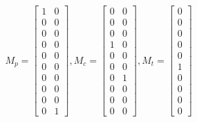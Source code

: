 	\begin{equation*}
		M_{p} = \begin{bmatrix}
			1 & 0\\
			0 & 0\\
			0 & 0\\
			0 & 0\\
			0 & 0\\
			0 & 0\\
			0 & 0\\
			0 & 0\\
			0 & 0\\
			0 & 1
		\end{bmatrix},
		M_{c} = \begin{bmatrix}
			0 & 0\\
			0 & 0\\
			0 & 0\\
			1 & 0\\
			0 & 0\\
			0 & 0\\
			0 & 1\\
			0 & 0\\
			0 & 0\\
			0 & 0
		\end{bmatrix},
		M_{t} = \begin{bmatrix}
			0\\
			0\\
			0\\
			0\\
			0\\
			1\\
			0\\
			0\\
			0\\
			0
		\end{bmatrix}
	\end{equation*}
	
	
	

